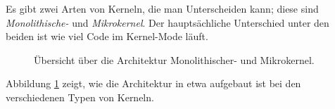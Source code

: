 \documentclass[ngerman,abstract=true]{scrartcl}
\begin{document}
Es gibt zwei Arten von Kerneln, die man Unterscheiden kann; diese sind \emph{Monolithische-} und \emph{Mikrokernel}. Der hauptsächliche Unterschied unter den beiden ist wie viel Code im Kernel-Mode läuft. 
\begin{figure}[tbp]\centering
{}
\caption{Übersicht über die Architektur Monolithischer- und Mikrokernel.}\label{fig:monolith}
\end{figure}
Abbildung \ref{fig:monolith} zeigt, wie die Architektur in etwa aufgebaut ist bei den verschiedenen Typen von Kerneln.
\end{document}
